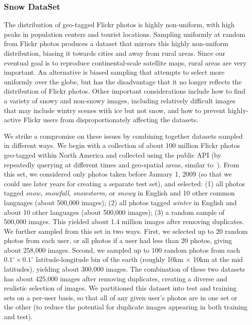 \subsubsection{Snow DataSet}

The distribution of geo-tagged Flickr photos is highly
non-uniform, with high peaks in population centers and tourist
locations.  Sampling uniformly at random from  Flickr photos
produces a dataset that mirrors this highly non-uniform distribution,
biasing it towards cities and away from rural areas. Since our
eventual goal is to reproduce continental-scale satellite maps, rural
areas are very important. An alternative is biased sampling that
attempts to select more uniformly over the globe, but has the
disadvantage that it no longer reflects the distribution of Flickr
photos. Other important considerations include how to find a variety
of snowy and non-snowy images, including relatively difficult images
that may include wintry scenes with ice but not snow, and how to
prevent highly-active Flickr users from disproportionately affecting
the datasets.

We strike a compromise on these issues by combining together datasets
sampled in different ways.  We begin with a collection of about 100
million Flickr photos geo-tagged within North America and collected
using the public API (by repeatedly querying at different times and
geo-spatial areas, similar to~\cite{hays}). From this set, we
considered only photos taken before January 1, 2009 (so that we could
use later years for creating a separate test set), and selected:
%
(1) all photos tagged \textit{snow,} \textit{snowfall,} \textit{snowstorm,} or \textit{snowy} in
  English and 10 other common languages (about 500,000 images);
(2) all photos tagged \textit{winter} in English and about 10 other languages (about 500,000 images);
(3) a random sample of 500,000 images.
%
This yielded about 1.4 million images after removing duplicates.  We
further sampled from this set in two ways. First, we selected up to 20
random photos from each user, or all photos if a user had less than 20
photos, giving about 258,000 images. Second, we sampled up to 100
random photos from each $0.1^\circ \times 0.1^\circ$
latitude-longitude bin of the earth (roughly 10km $\times$ 10km at the
mid latitudes), yielding about 300,000 images. The combination of
these two datasets has about 425,000 images after removing duplicates,
creating 
a diverse and realistic selection
of images.  We partitioned this dataset into test and training
sets on a per-user basis, so that all of any given user's photos are
in one set or the other  (to reduce the potential
for duplicate images appearing in both
training and test).

